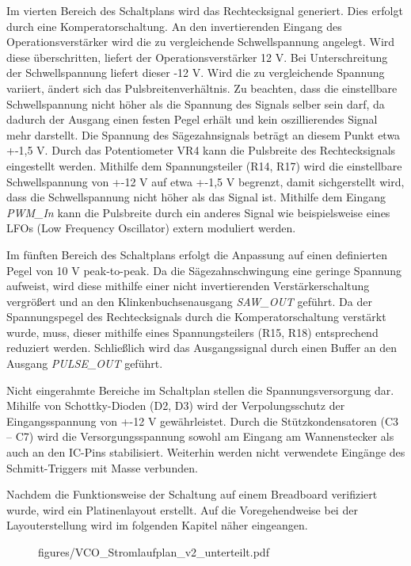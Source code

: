 Im vierten Bereich des Schaltplans wird das Rechtecksignal generiert. 
Dies erfolgt durch eine Komperatorschaltung.
An den invertierenden Eingang des Operationsverstärker wird die zu vergleichende Schwellspannung angelegt. 
Wird diese überschritten, liefert der Operationsverstärker 12 V. 
Bei Unterschreitung der Schwellspannung liefert dieser -12 V.
Wird die zu vergleichende Spannung variiert, ändert sich das Pulsbreitenverhältnis.
Zu beachten, dass die einstellbare Schwellspannung nicht höher als die Spannung des Signals selber sein darf, da dadurch der Ausgang einen festen Pegel erhält und kein oszillierendes Signal mehr darstellt.
Die Spannung des Sägezahnsignals beträgt an diesem Punkt etwa +-1,5 V.
Durch das Potentiometer VR4 kann die Pulsbreite des Rechtecksignals eingestellt werden.
Mithilfe dem Spannungsteiler (R14, R17) wird die einstellbare Schwellspannung von +-12 V auf etwa +-1,5 V begrenzt, damit sichgerstellt wird, dass die Schwellspannung nicht höher als das Signal ist.
Mithilfe dem Eingang \textit{PWM\_In} kann die Pulsbreite durch ein anderes Signal wie beispielsweise eines LFOs (Low Frequency Oscillator) extern moduliert werden.

Im fünften Bereich des Schaltplans erfolgt die Anpassung auf einen definierten Pegel von 10 V peak-to-peak. 
Da die Sägezahnschwingung eine geringe Spannung aufweist, wird diese mithilfe einer nicht invertierenden Verstärkerschaltung vergrößert und an den Klinkenbuchsenausgang \textit{SAW\_OUT} geführt. 
Da der Spannungspegel des Rechtecksignals durch die Komperatorschaltung verstärkt wurde, muss, dieser mithilfe eines Spannungsteilers (R15, R18) entsprechend reduziert werden. 
Schließlich wird das Ausgangssignal durch einen Buffer an den Ausgang \textit{PULSE\_OUT} geführt.

Nicht eingerahmte Bereiche im Schaltplan stellen die Spannungsversorgung dar. 
Mihilfe von Schottky-Dioden (D2, D3) wird der Verpolungsschutz der Eingangsspannung von +-12 V gewährleistet. 
Durch die Stützkondensatoren (C3 -- C7) wird die Versorgungsspannung sowohl am Eingang am Wannenstecker als auch an den IC-Pins stabilisiert.
Weiterhin werden nicht verwendete Eingänge des Schmitt-Triggers mit Masse verbunden.

Nachdem die Funktionsweise der Schaltung auf einem Breadboard verifiziert wurde, wird ein Platinenlayout erstellt.
Auf die Voregehendweise bei der Layouterstellung wird im folgenden Kapitel näher eingeangen.

\newpage
\begin{figure}[h]
\centering
 {figures/VCO_Stromlaufplan_v2_unterteilt.pdf}
\label{fig:VCO_Stromlaufplan_v2}
\end{figure}

